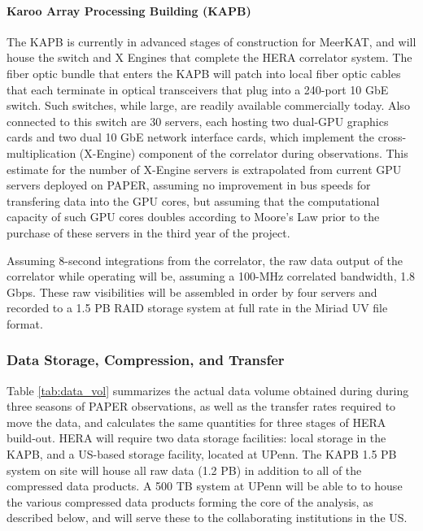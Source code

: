 \documentclass[preprint]{aastex}
\begin{document}
\paragraph{Karoo Array Processing Building (KAPB)}

The KAPB is currently
in advanced stages of construction for MeerKAT, and will house the switch and X Engines that
complete the HERA correlator system.  The fiber optic bundle that enters the KAPB will patch
into local fiber optic cables 
that each terminate in optical transceivers that plug into a 240-port 10 GbE switch.
Such switches, while large, are readily available commercially today.  Also connected to
this switch are 30 servers, each hosting two dual-GPU graphics cards and two dual
10 GbE network interface cards, which implement the cross-multiplication (X-Engine) component
of the correlator during observations.  This estimate for the number of X-Engine servers
is extrapolated from current GPU servers deployed on PAPER, assuming no improvement in bus
speeds for transfering data into the GPU cores, but assuming that the computational
capacity of such GPU cores doubles according to Moore's Law prior to the purchase of
these servers in the third year of the project.

Assuming 8-second integrations from the correlator, the raw data output of the
correlator while operating will be, assuming a 100-MHz correlated bandwidth, 1.8 Gbps.
These raw visibilities will be assembled in order by four servers
and recorded to a 1.5 PB RAID storage system at full rate in the Miriad UV
file format.



\subsubsection{Data Storage, Compression, and Transfer}

Table \ref{tab:data_vol} summarizes the actual data volume obtained
during during three seasons of PAPER observations, as well as the
transfer rates required to move the data, and calculates the same
quantities for three stages of HERA build-out.  HERA will require two
data storage facilities: local storage in the KAPB, and a US-based
storage facility, located at UPenn. The KAPB 1.5 PB system on site
will house all raw data (1.2 PB) in addition to all of the compressed
data products. A 500 TB system at UPenn will be able to to house the
various compressed data products forming the core of the analysis, as
described below, and will serve these to the collaborating institutions
in the US.
\end{document}
